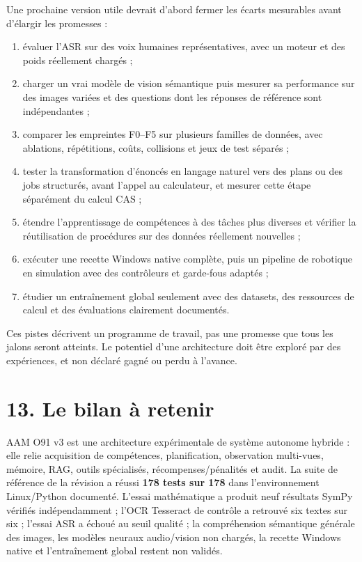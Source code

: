 \documentclass[11pt,a4paper]{article}
\begin{document}
Une prochaine version utile devrait d'abord fermer les écarts mesurables avant d'élargir les promesses :

\begin{enumerate}
\item évaluer l'ASR sur des voix humaines représentatives, avec un moteur et des poids réellement chargés ;
\item charger un vrai modèle de vision sémantique puis mesurer sa performance sur des images variées et des questions dont les réponses de référence sont indépendantes ;
\item comparer les empreintes F0--F5 sur plusieurs familles de données, avec ablations, répétitions, coûts, collisions et jeux de test séparés ;
\item tester la transformation d'énoncés en langage naturel vers des plans ou des jobs structurés, avant l'appel au calculateur, et mesurer cette étape séparément du calcul CAS ;
\item étendre l'apprentissage de compétences à des tâches plus diverses et vérifier la réutilisation de procédures sur des données réellement nouvelles ;
\item exécuter une recette Windows native complète, puis un pipeline de robotique en simulation avec des contrôleurs et garde-fous adaptés ;
\item étudier un entraînement global seulement avec des datasets, des ressources de calcul et des évaluations clairement documentés.
\end{enumerate}

Ces pistes décrivent un programme de travail, pas une promesse que tous les jalons seront atteints. Le potentiel d'une architecture doit être exploré par des expériences, et non déclaré gagné ou perdu à l'avance.

\section*{13. Le bilan à retenir}

AAM O91 v3 est une architecture expérimentale de système autonome hybride : elle relie acquisition de compétences, planification, observation multi-vues, mémoire, RAG, outils spécialisés, récompenses/pénalités et audit. La suite de référence de la révision a réussi \textbf{178 tests sur 178} dans l'environnement Linux/Python documenté. L'essai mathématique a produit neuf résultats SymPy vérifiés indépendamment ; l'OCR Tesseract de contrôle a retrouvé six textes sur six ; l'essai ASR a échoué au seuil qualité ; la compréhension sémantique générale des images, les modèles neuraux audio/vision non chargés, la recette Windows native et l'entraînement global restent non validés.
\end{document}
